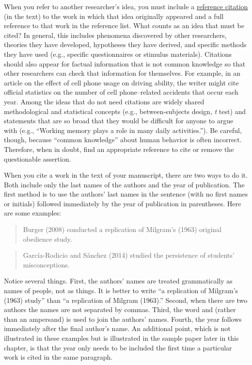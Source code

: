 \documentclass[
]{krantz}
\begin{document}
When you refer to another researcher's idea, you must include a \hyperref[reference-citation]{reference citation} (in the text) to the work in which that idea originally appeared and a full reference to that work in the reference list. What counts as an idea that must be cited? In general, this includes phenomena discovered by other researchers, theories they have developed, hypotheses they have derived, and specific methods they have used (e.g., specific questionnaires or stimulus materials). Citations should also appear for factual information that is not common knowledge so that other researchers can check that information for themselves. For example, in an article on the effect of cell phone usage on driving ability, the writer might cite official statistics on the number of cell phone--related accidents that occur each year. Among the ideas that do not need citations are widely shared methodological and statistical concepts (e.g., between-subjects design, \emph{t} test) and statements that are so broad that they would be difficult for anyone to argue with (e.g., ``Working memory plays a role in many daily activities.''). Be careful, though, because ``common knowledge'' about human behavior is often incorrect. Therefore, when in doubt, find an appropriate reference to cite or remove the questionable assertion.

When you cite a work in the text of your manuscript, there are two ways to do it. Both include only the last names of the authors and the year of publication. The first method is to use the authors' last names in the sentence (with no first names or initials) followed immediately by the year of publication in parentheses. Here are some examples:

\begin{quote}
Burger (2008) conducted a replication of Milgram's (1963) original obedience study.
\end{quote}

\begin{quote}
García-Rodicio and Sánchez (2014) studied the persistence of students' misconceptions.
\end{quote}

Notice several things. First, the authors' names are treated grammatically as names of people, not as things. It is better to write ``a replication of Milgram's (1963) study'' than ``a replication of Milgram (1963).'' Second, when there are two authors the names are not separated by commas. Third, the word and (rather than an ampersand) is used to join the authors' names. Fourth, the year follows immediately after the final author's name. An additional point, which is not illustrated in these examples but is illustrated in the sample paper later in this chapter, is that the year only needs to be included the first time a particular work is cited in the same paragraph.
\end{document}
